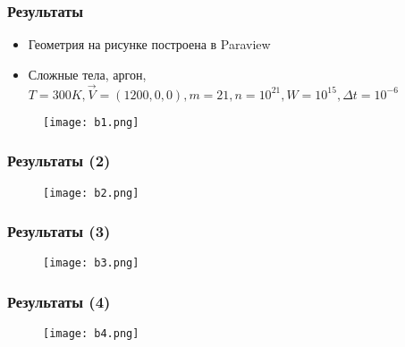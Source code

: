 \documentclass[onlymath]{beamer}
\begin{document}
\begin{frame}
  \frametitle{Результаты}
  \begin{itemize}
  \item Геометрия на рисунке построена в Paraview
  \item Сложные тела, аргон, $T = 300K, \vec{V} = (1200, 0, 0), m =
    21, n = 10^{21}, W = 10^{15}, \Delta t = 10^{-6}$
  \end{itemize}
  \begin{figure}
    \centering
    \texttt{[image: b1.png]}
  \end{figure}
\end{frame}

\begin{frame}
  \frametitle{Результаты (2)}
  \begin{figure}
    \centering
    \texttt{[image: b2.png]}
  \end{figure}
\end{frame}

\begin{frame}
  \frametitle{Результаты (3)}
  \begin{figure}
    \centering
    \texttt{[image: b3.png]}
  \end{figure}
\end{frame}

\begin{frame}
  \frametitle{Результаты (4)}
  \begin{figure}
    \centering
    \texttt{[image: b4.png]}
  \end{figure}
\end{frame}
\end{document}
